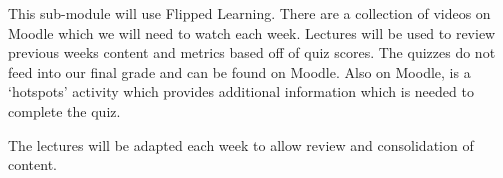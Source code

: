 
This sub-module will use Flipped Learning. There are a collection of videos on Moodle which we will need to watch each week. Lectures will be used to review previous weeks content and metrics based off of quiz scores. The quizzes do not feed into our final grade and can be found on Moodle. Also on Moodle, is a `hotspots' activity which provides additional information which is needed to complete the quiz. 

The lectures will be adapted each week to allow review and consolidation of content.
